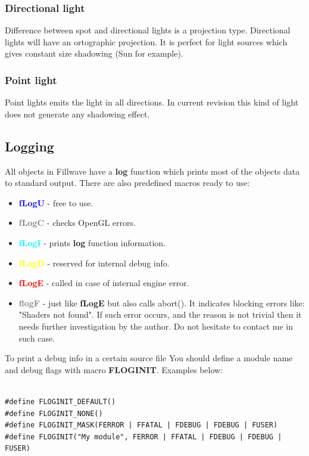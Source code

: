 \documentclass{article}
\begin{document}
\subsubsection{Directional light}\label{sec:Directional light}
\indent \indent Difference between spot and directional lights is a projection type. Directional lights will have an ortographic projection. It is perfect for light sources which gives constant size shadowing (Sun for example).

\subsubsection{Point light}\label{sec:Point light}
\indent \indent Point lights emits the light in all directions. In current revision this kind of light does not generate any shadowing effect.

\subsection{Logging}\label{sec:Logging}
\indent \indent All objects in Fillwave have a \textbf{log} function which prints most of the objects data to standard output. There are also predefined macros ready to use:

\begin{itemize}
\item \textbf{\textcolor{blue}{fLogU}} - free to use.
\item \textbf{\textcolor{gray}{fLogC}} - checks OpenGL errors.
\item \textbf{\textcolor{cyan}{fLogI}} - prints \textbf{log} function information.
\item \textbf{\textcolor{yellow}{fLogD}} - reserved for internal debug info.
\item \textbf{\textcolor{red}{fLogE}} - called in case of internal engine error.
\item \textbf{\textcolor{gray}{flogF}} - just like \textbf{fLogE} but also calls abort(). It indicates blocking errors like: "Shaders not found". If such error occurs, and the reason is not trivial then it needs further investigation by the author. Do not hesitate to contact me in such case.
\end{itemize}
\indent To print a debug info in a certain source file You should define a module name and debug flags with macro \textbf{FLOGINIT}. Examples below:
\begin{lstlisting}

#define FLOGINIT_DEFAULT()
#define FLOGINIT_NONE()
#define FLOGINIT_MASK(FERROR | FFATAL | FDEBUG | FDEBUG | FUSER)
#define FLOGINIT("My module", FERROR | FFATAL | FDEBUG | FDEBUG | FUSER)


\end{lstlisting}
\end{document}
